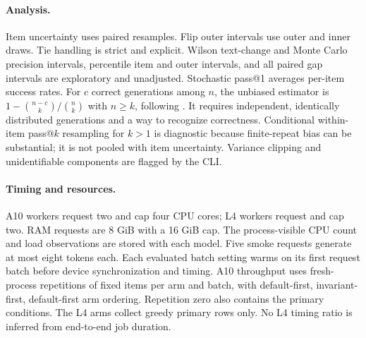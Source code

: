 \documentclass[10pt,twocolumn]{article}
\newcommand{\code}[1]{\texttt{#1}}
\begin{document}
\paragraph{Analysis.}
Item uncertainty uses \BootstrapCount{} paired resamples. Flip outer intervals use \OuterCount{} outer and \InnerCount{} inner draws. Tie handling is strict and explicit. Wilson text-change and Monte Carlo precision intervals, percentile item and outer intervals, and all paired gap intervals are exploratory and unadjusted. Stochastic pass@1 averages per-item success rates. For $c$ correct generations among $n$, the unbiased estimator is $1-\binom{n-c}{k}/\binom{n}{k}$ with $n\ge k$, following \citet{chen2021code}. It requires independent, identically distributed generations and a way to recognize correctness. Conditional within-item pass@$k$ resampling for $k>1$ is diagnostic because finite-repeat bias can be substantial; it is not pooled with item uncertainty. Variance clipping and unidentifiable components are flagged by the CLI.

\begin{table}[htbp]\centering\small

\caption{Saved paired-flip analysis seeds. Each seeds the stated paired resampling procedure; outer and inner counts remain \OuterCount{} and \InnerCount{}. Condition-specific item/sampling analyses retain the root seed in their JSON.}
\end{table}

\paragraph{Timing and resources.}
A10 workers request two and cap four CPU cores; L4 workers request and cap two. RAM requests are 8 GiB with a 16 GiB cap. The process-visible CPU count and load observations are stored with each model. Five smoke requests generate at most eight tokens each. Each evaluated batch setting warms on its first request batch before device synchronization and timing. A10 throughput uses \TimingRepetitions{} fresh-process repetitions of \TimingItems{} fixed items per arm and batch, with default-first, invariant-first, default-first arm ordering. Repetition zero also contains the primary conditions. The L4 arms collect greedy primary rows only. No L4 timing ratio is inferred from end-to-end job duration.

\begin{table}[t]\centering\scriptsize

\caption{Frozen model revisions and seed indices. License metadata is an identifier, not a replacement for the linked official license terms in the release artifacts. No weights are included.}
\end{table}
\begin{table}[t]\centering\scriptsize

\caption{Recorded physical assignment and driver versions. Full UUIDs, host-load observations, package versions, CPU limits, and source attestations are available in \code{paper/artifact-map.json} and original model JSON. Visible CPUs are observations, not a claim of equal effective host capacity.}
\end{table}
\end{document}
